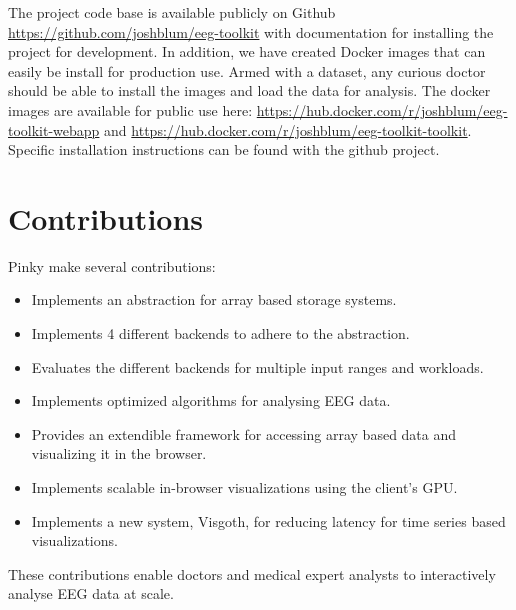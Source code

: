 The project code base is available publicly on Github \cite{github}
\url{https://github.com/joshblum/eeg-toolkit} with documentation for installing
the project for development. In addition, we have created Docker \cite{docker}
images that can easily be install for production use. Armed with a dataset, any
curious doctor should be able to install the images and load the data for
analysis. The docker images are available for public use here:
\url{https://hub.docker.com/r/joshblum/eeg-toolkit-webapp} and
\url{https://hub.docker.com/r/joshblum/eeg-toolkit-toolkit}. Specific
installation instructions can be found with the github project.

\section{Contributions}

Pinky make several contributions:

\begin{itemize}

  \item Implements an abstraction for array based storage systems.

  \item Implements 4 different backends to adhere to the abstraction.

  \item Evaluates the different backends for multiple input ranges and
    workloads.

  \item Implements optimized algorithms for analysing EEG data.

  \item Provides an extendible framework for accessing array based data and
    visualizing it in the browser.

  \item Implements scalable in-browser visualizations using the client's GPU.

  \item Implements a new system, Visgoth, for reducing latency for time series
    based visualizations.

\end{itemize}

These contributions enable doctors and medical expert analysts to interactively
analyse EEG data at scale.

